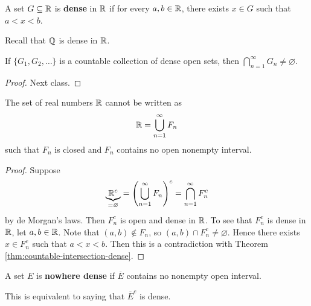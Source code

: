 \begin{definition}
  A set $G \subseteq \mathbb{R}$ is \textbf{dense} in $\mathbb{R}$ if for every
  $a, b \in \mathbb{R}$, there exists $x \in G$ such that $a < x < b$.
\end{definition}

\begin{remark}
  Recall that $\mathbb{Q}$ is dense in $\mathbb{R}$.
\end{remark}

\begin{theorem}
  \label{thm:countable-intersection-dense}
  If $\{G_1, G_2, \dots\}$ is a countable collection of dense
  open sets, then
  $\bigcap_{n = 1}^\infty G_n \ne \varnothing$.
\end{theorem}

\begin{proof}
  Next class.
\end{proof}

\begin{corollary}
  The set of real numbers $\mathbb{R}$ cannot be written as
  \[\mathbb{R} = \bigcup_{n = 1}^\infty F_n\]
  such that $F_n$ is closed and $F_n$ contains no open nonempty
  interval.
\end{corollary}

\begin{proof}
  Suppose
  \[\underbrace{\mathbb{R}^c}_{= \varnothing} = \left(\bigcup_{n = 1}^\infty F_n\right)^c = \bigcap_{n = 1}^\infty F_n^c\]
  by de Morgan's laws. Then $F_n^c$ is open and dense in $\mathbb{R}$. To
  see
  that $F_n^c$ is dense in $\mathbb{R}$, let $a, b \in \mathbb{R}$. Note that
  $(a, b) \notin F_n$, so $(a, b) \cap F_n^c \ne \varnothing$.
  Hence there exists $x \in F_n^c$ such that $a < x < b$. Then
  this is a contradiction with Theorem
  \ref{thm:countable-intersection-dense}.
\end{proof}

\begin{definition}
  A set $E$ is \textbf{nowhere dense} if $\overline{E}$ contains no
  nonempty open interval.
\end{definition}

\begin{remark}
  This is equivalent to saying that $\overline{E}^c$ is dense.
\end{remark}
